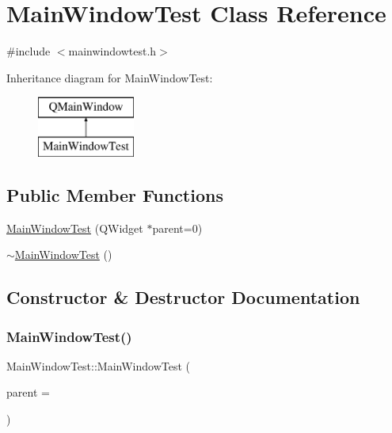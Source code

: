 \hypertarget{class_main_window_test}{}\section{Main\+Window\+Test Class Reference}
\label{class_main_window_test}


{\ttfamily \#include $<$mainwindowtest.\+h$>$}

Inheritance diagram for Main\+Window\+Test\+:\begin{figure}[H]
\begin{center}
\leavevmode
\includegraphics[height=2.000000cm]{class_main_window_test}
\end{center}
\end{figure}
\subsection*{Public Member Functions}
\begin{DoxyCompactItemize}
\item 
\mbox{\hyperlink{class_main_window_test_a86d9e79b7b1c9e041b859852c2b591d1}{Main\+Window\+Test}} (Q\+Widget $\ast$parent=0)
\item 
\mbox{\hyperlink{class_main_window_test_a59ff7d75abec3c73ff356ca606893e6d}{$\sim$\+Main\+Window\+Test}} ()
\end{DoxyCompactItemize}


\subsection{Constructor \& Destructor Documentation}
\mbox{\label{class_main_window_test_a86d9e79b7b1c9e041b859852c2b591d1}} 
\subsubsection{\texorpdfstring{Main\+Window\+Test()}{MainWindowTest()}}
{\footnotesize\ttfamily Main\+Window\+Test\+::\+Main\+Window\+Test (\begin{DoxyParamCaption}\item[{Q\+Widget $\ast$}]{parent = {} }\end{DoxyParamCaption})\hspace{0.3cm}{\ttfamily [explicit]}}


